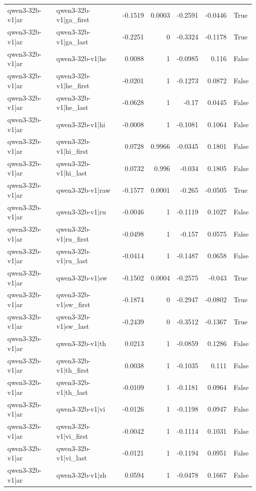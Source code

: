 \begin{table}
\begin{tabular}{l l r r r r l}
qwen3-32b-v1|ar & qwen3-32b-v1|ga_first & -0.1519 & 0.0003 & -0.2591 & -0.0446 & True \\
qwen3-32b-v1|ar & qwen3-32b-v1|ga_last & -0.2251 & 0 & -0.3324 & -0.1178 & True \\
qwen3-32b-v1|ar & qwen3-32b-v1|he & 0.0088 & 1 & -0.0985 & 0.116 & False \\
qwen3-32b-v1|ar & qwen3-32b-v1|he_first & -0.0201 & 1 & -0.1273 & 0.0872 & False \\
qwen3-32b-v1|ar & qwen3-32b-v1|he_last & -0.0628 & 1 & -0.17 & 0.0445 & False \\
qwen3-32b-v1|ar & qwen3-32b-v1|hi & -0.0008 & 1 & -0.1081 & 0.1064 & False \\
qwen3-32b-v1|ar & qwen3-32b-v1|hi_first & 0.0728 & 0.9966 & -0.0345 & 0.1801 & False \\
qwen3-32b-v1|ar & qwen3-32b-v1|hi_last & 0.0732 & 0.996 & -0.034 & 0.1805 & False \\
qwen3-32b-v1|ar & qwen3-32b-v1|raw & -0.1577 & 0.0001 & -0.265 & -0.0505 & True \\
qwen3-32b-v1|ar & qwen3-32b-v1|ru & -0.0046 & 1 & -0.1119 & 0.1027 & False \\
qwen3-32b-v1|ar & qwen3-32b-v1|ru_first & -0.0498 & 1 & -0.157 & 0.0575 & False \\
qwen3-32b-v1|ar & qwen3-32b-v1|ru_last & -0.0414 & 1 & -0.1487 & 0.0658 & False \\
qwen3-32b-v1|ar & qwen3-32b-v1|sw & -0.1502 & 0.0004 & -0.2575 & -0.043 & True \\
qwen3-32b-v1|ar & qwen3-32b-v1|sw_first & -0.1874 & 0 & -0.2947 & -0.0802 & True \\
qwen3-32b-v1|ar & qwen3-32b-v1|sw_last & -0.2439 & 0 & -0.3512 & -0.1367 & True \\
qwen3-32b-v1|ar & qwen3-32b-v1|th & 0.0213 & 1 & -0.0859 & 0.1286 & False \\
qwen3-32b-v1|ar & qwen3-32b-v1|th_first & 0.0038 & 1 & -0.1035 & 0.111 & False \\
qwen3-32b-v1|ar & qwen3-32b-v1|th_last & -0.0109 & 1 & -0.1181 & 0.0964 & False \\
qwen3-32b-v1|ar & qwen3-32b-v1|vi & -0.0126 & 1 & -0.1198 & 0.0947 & False \\
qwen3-32b-v1|ar & qwen3-32b-v1|vi_first & -0.0042 & 1 & -0.1114 & 0.1031 & False \\
qwen3-32b-v1|ar & qwen3-32b-v1|vi_last & -0.0121 & 1 & -0.1194 & 0.0951 & False \\
qwen3-32b-v1|ar & qwen3-32b-v1|zh & 0.0594 & 1 & -0.0478 & 0.1667 & False \\

\end{tabular}
\end{table}
